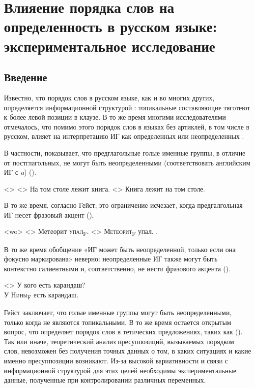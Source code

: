 \documentclass[a4paper, 12pt]{article}
\begin{document}
\section{Влияение порядка слов на определенность в русском языке: экспериментальное исследование}
\subsection{Введение}

Известно, что порядок слов в русском языке, как и во многих других, определяется информационной структурой \parencite{slyusar2018nastyketeoriy}: топикальные составляющие тяготеют к более левой позиции в клаузе. В то же время многими исследователями отмечалось, что помимо этого порядок слов в языках без артиклей, в том числе в русском, влияет на интерпретацию ИГ как определенных или неопределенных \parencite[и пр.]{brun2001informationstructurestatus,geist2010baresingularnps}.

В частности, \textcite{geist2010baresingularnps} показывает, что предглагольные голые именные группы, в отличие от постглагольных, не могут быть неопределенными (соответствовать английским ИГ с \textit{a}) (\nextx).

\pex<>
    \a<> На том столе лежит книга. 
    \a<> Книга лежит на том столе. 
\xe

В то же время, согласно Гейст, это ограничение исчезает, когда предгалгольная ИГ несет фразовый акцент (\nextx).

\pex<wo>
    \a<> Метеорит \textsc{упал}\textsubscript{F}. 
    \a<> \textsc{Метеорит}\textsubscript{F} упал. .
\xe

В то же время обобщение «ИГ может быть неопределенной, только если она фокусно маркирована» неверно: неопределенные ИГ также могут быть контекстно салиентными и, соответственно, не нести фразового акцента (\nextx).

\ex<>
    У кого есть карандаш?\\
    \textsc{У Нины}\textsubscript{F} есть карандаш.
\xe

Гейст заключает, что голые именные группы могут быть неопределенными, только когда не являются топикальными. В то же время остается открытым вопрос, что определяет порядок слов в тетических предложениях, таких как (). Так или иначе, теоретический анализ пресуппозиций, вызываемых порядком слов, невозможен без получения точных данных о том, в каких ситуациях и какие именно пресуппозиции возникают. Из-за высокой вариативности и связи с информационной структурой для этих целей необходимы экспериментальные данные, полученные при контролировании различных переменных.
\end{document}
